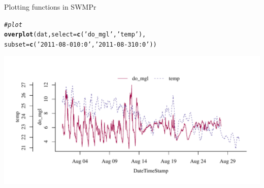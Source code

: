 \documentclass[xcolor=dvipsnames,serif]{beamer}\usepackage[]{graphicx}\usepackage[]{color}
\makeatletter
\newcommand{\hlstr}[1]{\textcolor[rgb]{0.192,0.494,0.8}{#1}}%
\newcommand{\hlcom}[1]{\textcolor[rgb]{0.678,0.584,0.686}{\textit{#1}}}%
\newcommand{\hlstd}[1]{\textcolor[rgb]{0.345,0.345,0.345}{#1}}%
\newcommand{\hlkwc}[1]{\textcolor[rgb]{0.333,0.667,0.333}{#1}}%
\newcommand{\hlkwd}[1]{\textcolor[rgb]{0.737,0.353,0.396}{\textbf{#1}}}%
\newenvironment{kframe}{%
 \def\at@end@of@kframe{}%
 \ifinner\ifhmode%
  \def\at@end@of@kframe{\end{minipage}}%
  \begin{minipage}{\columnwidth}%
 \fi\fi%
 \def\FrameCommand##1{\hskip\@totalleftmargin \hskip-\fboxsep
 \colorbox{shadecolor}{##1}\hskip-\fboxsep
     \hskip-\linewidth \hskip-\@totalleftmargin \hskip\columnwidth}%
 \MakeFramed {\advance\hsize-\width
   \@totalleftmargin\z@ \linewidth\hsize
   \@setminipage}}%
 {\par\unskip\endMakeFramed%
 \at@end@of@kframe}
\newenvironment{knitrout}{}{} %
\makeatother
\begin{document}
\begin{frame}[fragile, t]{Plotting functions in SWMPr}
\begin{knitrout}\scriptsize
{}\color{fgcolor}\begin{kframe}
\begin{alltt}
\hlcom{# plot}
\hlkwd{overplot}\hlstd{(dat,} \hlkwc{select} \hlstd{=} \hlkwd{c}\hlstd{(}\hlstr{'do_mgl'}\hlstd{,} \hlstr{'temp'}\hlstd{),}
  \hlkwc{subset} \hlstd{=} \hlkwd{c}\hlstd{(}\hlstr{'2011-08-01 0:0'}\hlstd{,} \hlstr{'2011-08-31 0:0'}\hlstd{))}
\end{alltt}
\end{kframe}

{\centering \includegraphics[width=\textwidth]{figure/unnamed-chunk-29-1} 

}



\end{knitrout}
\end{frame}
\end{document}

